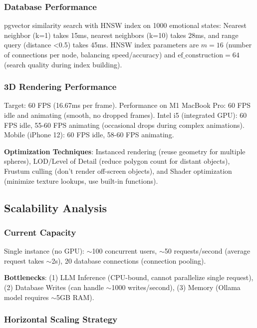 \subsubsection{Database Performance}

pgvector similarity search with HNSW index on 1000 emotional states: Nearest neighbor (k=1) takes 15ms, nearest neighbors (k=10) takes 28ms, and range query (distance <0.5) takes 45ms. HNSW index parameters are $m = 16$ (number of connections per node, balancing speed/accuracy) and $\text{ef\_construction} = 64$ (search quality during index building).

\subsubsection{3D Rendering Performance}

Target: 60 FPS (16.67ms per frame). Performance on M1 MacBook Pro: 60 FPS idle and animating (smooth, no dropped frames). Intel i5 (integrated GPU): 60 FPS idle, 55-60 FPS animating (occasional drops during complex animations). Mobile (iPhone 12): 60 FPS idle, 58-60 FPS animating.

\textbf{Optimization Techniques}: Instanced rendering (reuse geometry for multiple spheres), LOD/Level of Detail (reduce polygon count for distant objects), Frustum culling (don't render off-screen objects), and Shader optimization (minimize texture lookups, use built-in functions).

\subsection{Scalability Analysis}

\subsubsection{Current Capacity}

Single instance (no GPU): $\sim$100 concurrent users, $\sim$50 requests/second (average request takes $\sim$2s), 20 database connections (connection pooling).

\textbf{Bottlenecks}: (1) LLM Inference (CPU-bound, cannot parallelize single request), (2) Database Writes (can handle $\sim$1000 writes/second), (3) Memory (Ollama model requires $\sim$5GB RAM).

\subsubsection{Horizontal Scaling Strategy}

